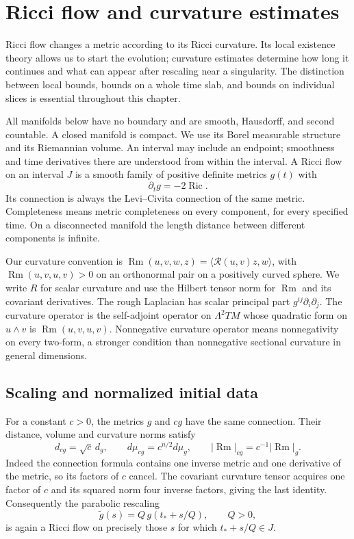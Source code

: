 \chapter{Ricci flow and curvature estimates}
\label{ch:ricci-flow-v4}

Ricci flow changes a metric according to its Ricci curvature.  Its local
existence theory allows us to start the evolution; curvature estimates
determine how long it continues and what can appear after rescaling near a
singularity.  The distinction between local bounds, bounds on a whole time
slab, and bounds on individual slices is essential throughout this chapter.

All manifolds below have no boundary and are smooth, Hausdorff, and second
countable.  A closed manifold is compact.  We use its Borel measurable
structure and its Riemannian volume.  An interval may include an endpoint;
smoothness and time derivatives there are understood from within the interval.
A Ricci flow on an interval $J$ is a smooth family of positive definite
metrics $g(t)$ with
\begin{equation}\label{eq:rf-equation}
                         \partial_t g=-2\operatorname{Ric}.
\end{equation}
Its connection is always the Levi--Civita connection of the same metric.
Completeness means metric completeness on every component, for every
specified time.  On a disconnected manifold the length distance between
different components is infinite.

Our curvature convention is
$\operatorname{Rm}(u,v,w,z)=\langle\mathcal R(u,v)z,w\rangle$,
with $\operatorname{Rm}(u,v,u,v)>0$ on an orthonormal pair on a positively
curved sphere.  We write $R$ for scalar curvature and use the Hilbert tensor
norm for $\operatorname{Rm}$ and its covariant derivatives.  The rough
Laplacian has scalar principal part $g^{ij}\partial_i\partial_j$.
The curvature operator is the self-adjoint operator on $\Lambda^2 TM$
whose quadratic form on $u\wedge v$ is
$\operatorname{Rm}(u,v,u,v)$.  Nonnegative curvature operator means
nonnegativity on every two-form, a stronger condition than nonnegative
sectional curvature in general dimensions.

\section{Scaling and normalized initial data}
\label{sec:rf-normalization}

For a constant $c>0$, the metrics $g$ and $cg$ have the same connection.
Their distance, volume and curvature norms satisfy
\begin{equation}\label{eq:rf-scaling}
 d_{cg}=\sqrt c\,d_g,\qquad d\mu_{cg}=c^{n/2}d\mu_g,\qquad
 |\operatorname{Rm}|_{cg}=c^{-1}|\operatorname{Rm}|_g.
\end{equation}
Indeed the connection formula contains one inverse metric and one
derivative of the metric, so its factors of $c$ cancel.  The covariant
curvature tensor acquires one factor of $c$ and its squared norm four
inverse factors, giving the last identity.  Consequently the parabolic
rescaling
\[
                    \widetilde g(s)=Q\,g(t_*+s/Q),\qquad Q>0,
\]
is again a Ricci flow on precisely those $s$ for which $t_*+s/Q\in J$.

